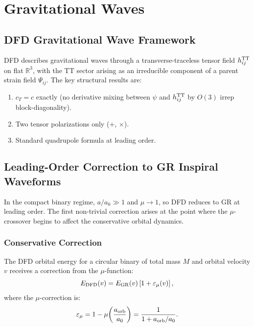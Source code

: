 \documentclass[aps,prd,twocolumn,superscriptaddress,nofootinbib]{revtex4-2}
\begin{document}
\section{Gravitational Waves}\label{sec:gw}

\subsection{DFD Gravitational Wave Framework}

DFD describes gravitational waves through a transverse-traceless
tensor field $h_{ij}^{\rm TT}$ on flat $\mathbb{R}^3$, with the
TT sector arising as an irreducible component of a parent strain
field $\Psi_{ij}$. The key structural results are:

\begin{enumerate}[nosep]
\item $c_T = c$ exactly (no derivative mixing between $\psi$ and
  $h_{ij}^{\rm TT}$ by $O(3)$ irrep block-diagonality).
\item Two tensor polarizations only ($+$, $\times$).
\item Standard quadrupole formula at leading order.
\end{enumerate}

\subsection{Leading-Order Correction to GR Inspiral Waveforms}

In the compact binary regime, $a/a_0 \gg 1$ and $\mu \to 1$,
so DFD reduces to GR at leading order. The first non-trivial
correction arises at the point where the $\mu$-crossover begins
to affect the conservative orbital dynamics.

\subsubsection{Conservative Correction}

The DFD orbital energy for a circular binary of total mass $M$
and orbital velocity $v$ receives a correction from the
$\mu$-function:
\begin{equation}
E_{\rm DFD}(v) = E_{\rm GR}(v)\left[1 + \varepsilon_\mu(v)\right],
\end{equation}
where the $\mu$-correction is:
\begin{equation}
\varepsilon_\mu = 1 - \mu\!\left(\frac{a_{\rm orb}}{a_0}\right)
= \frac{1}{1 + a_{\rm orb}/a_0}.
\end{equation}
\end{document}
